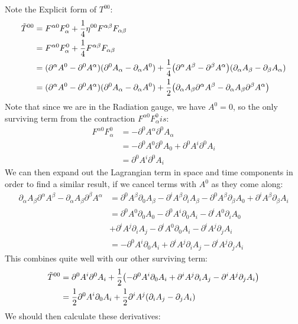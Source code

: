 \documentclass[12pt]{article}
\newcommand{\D}{\partial}
\begin{document}
Note the Explicit form of $T^{00}$:
\begin{align*}
  \tilde{T}^{00}&=
  F^{\alpha0}F^0_\alpha+\frac14\eta^{00}F^{\alpha\beta}F_{\alpha\beta}\\
  &=F^{\alpha0}F^0_\alpha+\frac14F^{\alpha\beta}F_{\alpha\beta}\\
  &=(\D^\alpha A^0-\D^0A^\alpha)(\D^0A_\alpha-\D_\alpha A^0)
  +\frac14
  \qty(\D^\alpha A^\beta-\D^\beta A^\alpha)
  \qty(\D_\alpha A_\beta-\D_\beta A_\alpha)\\
  &=(\D^\alpha A^0-\D^0A^\alpha)(\D^0A_\alpha-\D_\alpha A^0)
  +\frac12\qty(\D_\alpha A_\beta\D^\alpha A^\beta
  -\D_\alpha A_\beta\D^\beta A^\alpha)
\end{align*}
Note that since we are in the Radiation gauge, we have $A^0=0$, so the only surviving term from the contraction $F^{\alpha0}F_{\alpha}^0 is$:
\begin{align*}
  F^{\alpha0}F^0_\alpha&=-\D^0A^\alpha\D^0A_\alpha\\
  &=-\D^0A^0\D^0A_0+\D^0A^i\D^0A_i\\
  &=\D^0A^i\D^0A_i
\end{align*}
We can then expand out the Lagrangian term in space and time components in order to find a similar result, if we cancel terms with $A^0$ as they come along:
\begin{align*}
  \D_\alpha A_\beta\D^\alpha A^\beta-\D_\alpha A_\beta\D^\beta A^\alpha&=
  \D^0A^\beta\D_0A_\beta-\D^iA^\beta\D_iA_\beta
  -\D^0A^\beta\D_\beta A_0+\D^iA^\beta\D_\beta A_i\\
  &=\D^0A^0\D_0A_0-\D^0A^i\D_0A_i-\D^iA^0\D_iA_0\\
  &+\D^iA^j\D_iA_j-\D^iA^0\D_0A_i-\D^iA^j\D_jA_i\\
  &=-\D^0A^i\D_0A_i+\D^iA^j\D_iA_j-\D^iA^j\D_jA_i
\end{align*}
This combines quite well with our other surviving term:
\begin{align*}
  \tilde{T}^{00}&=\D^0A^i\D^0A_i
  +\frac12\qty(-\D^0A^i\D_0A_i+\D^iA^j\D_iA_j-\D^iA^j\D_jA_i)\\
  &=\frac12\D^0A^i\D_0A_i+\frac12\D^iA^j(\D_iA_j-\D_jA_i)
\end{align*}
We should then calculate these derivatives:
\end{document}
